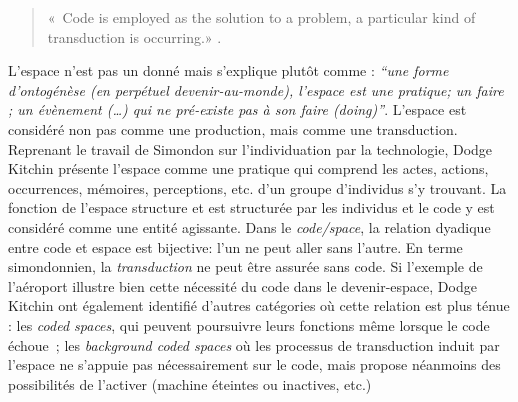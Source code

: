 \begin{quote}
« Code is employed as the solution to a problem, a particular kind of transduction 	is occurring.» \citep{Kitchin2011}. 
\end{quote}

L’espace n’est pas un donné mais s’explique plutôt comme : \textit{“une forme d’ontogénèse (en perpétuel devenir-au-monde), l’espace est une pratique; un faire ; un évènement (…) qui ne pré-existe pas à son faire (doing)”}. L’espace est considéré non pas comme une production, mais comme une transduction. Reprenant le travail de Simondon sur l’individuation par la technologie, Dodge  Kitchin présente l’espace comme une pratique qui comprend les actes, actions, occurrences, mémoires, perceptions, etc. d’un groupe d’individus s’y trouvant. La fonction de l’espace structure et est structurée par les individus et le code y est considéré comme une entité agissante. Dans le \textit{code/space}, la relation dyadique entre code et espace est bijective: l’un ne peut aller sans l’autre. En terme simondonnien, la \textit{transduction} ne peut être assurée sans code. Si l’exemple de l’aéroport illustre bien cette nécessité du code dans le devenir-espace, Dodge  Kitchin ont également identifié d’autres catégories où cette relation est plus ténue : les \textit{coded spaces}, qui peuvent poursuivre leurs fonctions même lorsque le code échoue ; les \textit{background coded spaces} où les processus de transduction induit par l’espace ne s’appuie pas nécessairement sur le code, mais propose néanmoins des possibilités de l’activer (machine éteintes ou inactives, etc.) 

